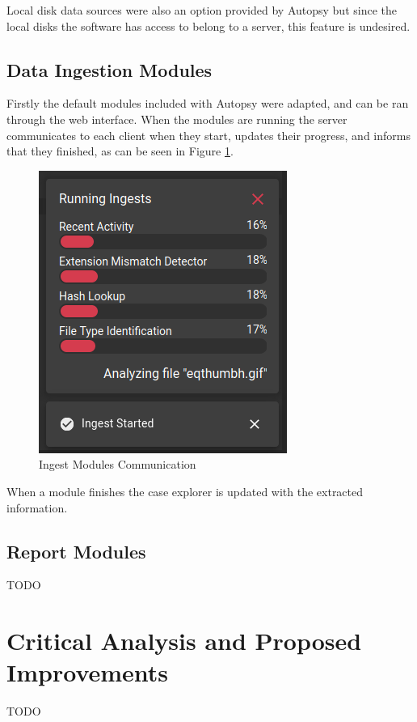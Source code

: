Local disk data sources were also an option provided by Autopsy but since the local disks the software has access to belong to a server, this feature is undesired.

\subsection{Data Ingestion Modules}

Firstly the default modules included with Autopsy were adapted, and can be ran through the web interface. When the modules are running the server communicates to each client when
they start, updates their progress, and informs that they finished, as can be seen in Figure \ref{fig:modules}.

\begin{figure}[ht]
 \centering
 \includegraphics[width=0.55\linewidth]{imgs/modules.png}
 \caption{Ingest Modules Communication}
 \label{fig:modules}
\end{figure}

When a module finishes the case explorer is updated with the extracted information.

\subsection{Report Modules}

TODO

\section{Critical Analysis and Proposed Improvements}

TODO

